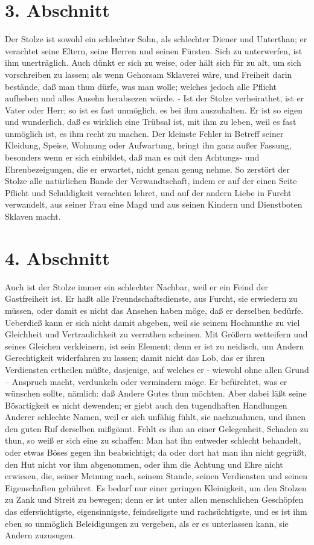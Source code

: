 \section{3. Abschnitt}

Der Stolze ist sowohl ein schlechter Sohn, als schlechter Diener und Unterthan;
er verachtet seine Eltern, seine Herren und seinen Fürsten. Sich zu unterwerfen,
ist ihm unerträglich. Auch dünkt er sich zu weise, oder hält sich für zu alt, um
sich vorschreiben zu lassen; als wenn Gehorsam Sklaverei wäre, und Freiheit
darin bestände, daß man thun dürfe, was man wolle; welches jedoch alle Pflicht
aufheben und alles Ansehn herabsezen würde. - Ist der Stolze verheirathet, ist
er Vater oder Herr; so ist es fast unmöglich, es bei ihm auszuhalten. Er ist so
eigen und wunderlich, daß es wirklich eine Trübsal ist, mit ihm zu leben, weil
es fast unmöglich ist, es ihm recht zu machen. Der kleinste Fehler in Betreff
seiner Kleidung, Speise, Wohnung oder Aufwartung, bringt ihn ganz außer Fassung,
besonders wenn er sich einbildet, daß man es mit den Achtungs- und
Ehrenbezeigungen, die er erwartet, nicht genau genug nehme. So zerstört der
Stolze alle natürlichen Bande der Verwandtschaft, indem er auf der einen Seite
Pflicht und Schuldigkeit verachten lehret, und auf der andern Liebe in Furcht
verwandelt, aus seiner Frau eine Magd und aus seinen Kindern und Dienstboten
Sklaven macht.

\section{4. Abschnitt}

Auch ist der Stolze immer ein schlechter Nachbar, weil er ein Feind der
Gastfreiheit ist. Er haßt alle Freundschaftsdienste, aus Furcht, sie erwiedern
zu müssen, oder damit es nicht das Ansehen haben möge, daß er derselben bedürfe.
Ueberdieß kann er sich nicht damit abgeben, weil sie seinem Hochmnthe zu viel
Gleichheit und Vertraulichkeit zu verrathen scheinen. Mit Größern wetteifern und
seines Gleichen verkleinern, ist sein Element; denn er ist zu neidisch, um
Andern Gerechtigkeit widerfahren zu lassen; damit nicht das Lob, das er ihren
Verdiensten ertheilen müßte, dasjenige, auf welches er - wiewohl ohne allen
Grund -- Anspruch macht, verdunkeln oder vermindern möge. Er befürchtet, was er
wünschen sollte, nämlich: daß Andere Gutes thun möchten. Aber dabei läßt seine
Bösartigkeit es nicht dewenden; er giebt auch den tugendhaften Handlungen
Anderer schlechte Namen, weil er sich unfähig fühlt, sie nachzuahmen, und ihnen
den guten Ruf derselben mißgönnt. Fehlt es ihm an einer Gelegenheit, Schaden zu
thun, so weiß er sich eine zu schaffen: Man hat ihn entweder schlecht behandelt,
oder etwas Böses gegen ihn beabsichtigt; da oder dort hat man ihn nicht gegrüßt,
den Hut nicht vor ihm abgenommen, oder ihm die Achtung und Ehre nicht erwiesen,
die, seiner Meinung nach, seinem Stande, seinen Verdiensten und seinen
Eigenschaften gebühret. Es bedarf nur einer geringen Kleinigkeit, um den Stolzen
zu Zank und Streit zu bewegen; denn er ist unter allen menschlichen Geschöpfen
das eifersüchtigste, eigensinnigste, feindseligste und rachsüchtigste, und es
ist ihm eben so unmöglich Beleidigungen zu vergeben, als er es unterlassen kann,
sie Andern zuzusugen.

